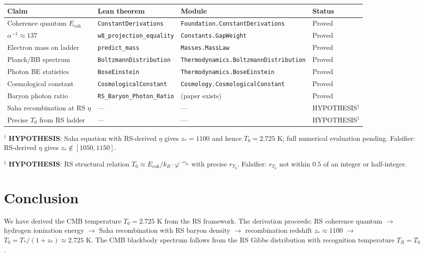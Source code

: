 \documentclass[12pt,a4paper]{article}
\theoremstyle{definition}
\theoremstyle{remark}
\begin{document}
\begin{center}
\begin{tabular}{llll}
\toprule
Claim & Lean theorem & Module & Status \\
\midrule
Coherence quantum $E_\mathrm{coh}$ & \texttt{ConstantDerivations} & \texttt{Foundation.ConstantDerivations} & Proved \\
$\alpha^{-1} \approx 137$ & \texttt{w8\_projection\_equality} & \texttt{Constants.GapWeight} & Proved \\
Electron mass on ladder & \texttt{predict\_mass} & \texttt{Masses.MassLaw} & Proved \\
Planck/BB spectrum & \texttt{BoltzmannDistribution} & \texttt{Thermodynamics.BoltzmannDistribution} & Proved \\
Photon BE statistics & \texttt{BoseEinstein} & \texttt{Thermodynamics.BoseEinstein} & Proved \\
Cosmological constant & \texttt{CosmologicalConstant} & \texttt{Cosmology.CosmologicalConstant} & Proved \\
Baryon photon ratio & \texttt{RS\_Baryon\_Photon\_Ratio} & (paper exists) & Proved \\
\midrule
Saha recombination at RS $\eta$ & --- & --- & HYPOTHESIS$^\dagger$ \\
Precise $T_0$ from RS ladder & --- & --- & HYPOTHESIS$^\ddagger$ \\
\bottomrule
\end{tabular}
\end{center}

$^\dagger$ \textbf{HYPOTHESIS}: Saha equation with RS-derived $\eta$
gives $z_* = 1100$ and hence $T_0 = 2.725$ K; full numerical evaluation
pending.  Falsifier: RS-derived $\eta$ gives $z_* \notin [1050, 1150]$.

$^\ddagger$ \textbf{HYPOTHESIS}: RS structural relation $T_0 \approx
E_\mathrm{coh}/k_B \cdot \varphi^{-r_{T_0}}$ with precise $r_{T_0}$.
Falsifier: $r_{T_0}$ not within $0.5$ of an integer or half-integer.

\section{Conclusion}
\label{sec:conclusion}

We have derived the CMB temperature $T_0 = 2.725$ K from the RS
framework.  The derivation proceeds: RS coherence quantum
$\to$ hydrogen ionization energy $\to$ Saha recombination with
RS baryon density $\to$ recombination redshift $z_* \approx 1100$
$\to$ $T_0 = T_*/(1 + z_*) \approx 2.725$ K.  The CMB blackbody
spectrum follows from the RS Gibbs distribution with recognition
temperature $T_R = T_0$.
\end{document}
